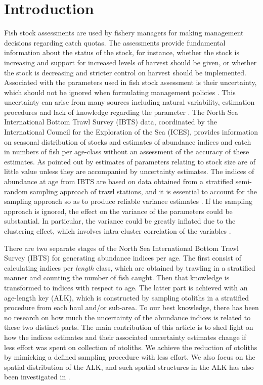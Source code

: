 \documentclass[a4paper 12pt]{article}
\numberwithin{equation}{section}
\begin{document}
\section{Introduction}
Fish stock assessments are used by fishery managers for making management decisions regarding catch quotas. The assessments provide fundamental information about the status of the stock, for instance, whether the stock is increasing and support for increased levels of harvest should be given, or whether the stock is decreasing and stricter control on harvest should be implemented. Associated with the parameters used in fish stock assessment is their uncertainty, which should not be ignored when formulating management policies \citep{walters1981effects, ludwig1981measurement}. This uncertainty can arise from many sources including natural variability, estimation procedures and lack of knowledge regarding the parameter \citep{ehrhardt1997role}. The North Sea International Bottom Trawl Survey (IBTS) data, coordinated by the International Council for the Exploration of the Sea (ICES), provides information on seasonal distribution of stocks and estimates of abundance indices and catch in numbers of fish per age-class without an assessment of the accuracy of these estimates.  As pointed out by  \citet{ludwig1981measurement} estimates of parameters relating to stock size are of little value unless they are accompanied by uncertainty estimates. The indices of abundance at age from IBTS  are based on data obtained from a stratified semi-random sampling approach of trawl stations,  and  it is essential to account for the sampling approach so as to produce reliable variance estimates \citep{lehtonen2004practical}. If the sampling approach is ignored, the effect on the variance  of the parameters could be substantial.  In particular, the variance could be greatly inflated  due to the clustering effect, which involves intra-cluster correlation of the variables \citep{aanes2015efficient, lehtonen2004practical}. 

There are two separate stages of the North Sea International Bottom Trawl Survey (IBTS) for generating abundance indices per age.  The first consist of calculating indices per \textit{length} class, which are obtained by trawling in a stratified manner and counting the number of fish caught. Then that knowledge is transformed to indices with respect to age. The latter part is achieved with an age-length key (ALK), which is constructed by sampling otoliths in a stratified procedure from each haul and/or sub-area. To our best knowledge, there has been no research on how much the uncertainty of the abundance indices is related to these two distinct parts. The main contribution of this article is to shed light on how the indices estimates and their associated uncertainty estimates change if less effort was spent on collection of otoliths. We achieve the reduction of otoliths by mimicking a defined sampling procedure with less effort. We also focus on the spatial distribution of the ALK, and such spatial structures in the ALK has also been investigated in \citet{berg2012spatial, hirst2012bayesian}.
\end{document}
